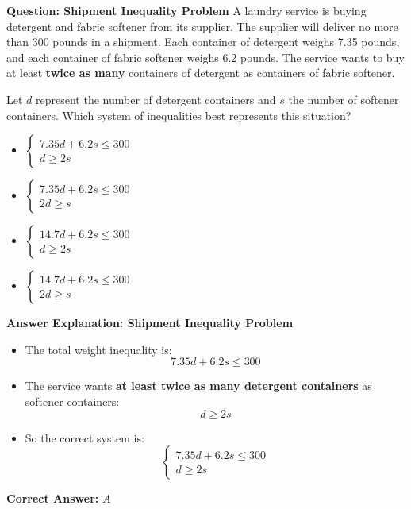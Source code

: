 \documentclass{beamer}
\begin{document}
\begin{frame}{\textbf{Question: Shipment Inequality Problem}}
    \small
    A laundry service is buying detergent and fabric softener from its supplier. The supplier will deliver no more than 300 pounds in a shipment. Each container of detergent weighs 7.35 pounds, and each container of fabric softener weighs 6.2 pounds. The service wants to buy at least \textbf{twice as many} containers of detergent as containers of fabric softener.

    Let \(d\) represent the number of detergent containers and \(s\) the number of softener containers. Which system of inequalities best represents this situation?

    \vspace{0.5em}
    \begin{itemize}
        \item[\textbf{A.}]
        \(\begin{cases}
        7.35d + 6.2s \leq 300 \\
        d \geq 2s
        \end{cases}\)

        \item[\textbf{B.}]
        \(\begin{cases}
        7.35d + 6.2s \leq 300 \\
        2d \geq s
        \end{cases}\)

        \item[\textbf{C.}]
        \(\begin{cases}
        14.7d + 6.2s \leq 300 \\
        d \geq 2s
        \end{cases}\)

        \item[\textbf{D.}]
        \(\begin{cases}
        14.7d + 6.2s \leq 300 \\
        2d \geq s
        \end{cases}\)
    \end{itemize}
\end{frame}

\begin{frame}{\textbf{Answer Explanation: Shipment Inequality Problem}}
    \small
    \begin{itemize}
        \item The total weight inequality is:
        \[
        7.35d + 6.2s \leq 300
        \]

        \item The service wants \textbf{at least twice as many detergent containers} as softener containers:
        \[
        d \geq 2s
        \]

        \item So the correct system is:
        \[
        \begin{cases}
        7.35d + 6.2s \leq 300 \\
        d \geq 2s
        \end{cases}
        \]
    \end{itemize}

    \textbf{Correct Answer:} \( \boxed{A} \)
\end{frame}
\end{document}
